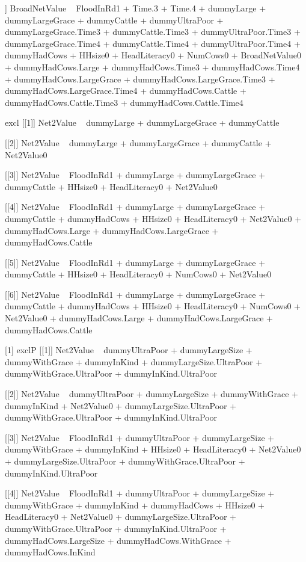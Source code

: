 \begin{Schunk}
\begin{Soutput}
[[6]]
BroadNetValue ~ FloodInRd1 + Time.3 + Time.4 + dummyLarge + dummyLargeGrace + 
    dummyCattle + dummyUltraPoor + dummyLargeGrace.Time3 + dummyCattle.Time3 + 
    dummyUltraPoor.Time3 + dummyLargeGrace.Time4 + dummyCattle.Time4 + 
    dummyUltraPoor.Time4 + dummyHadCows + HHsize0 + HeadLiteracy0 + 
    NumCows0 + BroadNetValue0 + dummyHadCows.Large + dummyHadCows.Time3 + 
    dummyHadCows.Time4 + dummyHadCows.LargeGrace + dummyHadCows.LargeGrace.Time3 + 
    dummyHadCows.LargeGrace.Time4 + dummyHadCows.Cattle + dummyHadCows.Cattle.Time3 + 
    dummyHadCows.Cattle.Time4
\end{Soutput}
\end{Schunk}
\begin{Schunk}
\begin{Soutput}
[1] excl
[[1]]
Net2Value ~ dummyLarge + dummyLargeGrace + dummyCattle

[[2]]
Net2Value ~ dummyLarge + dummyLargeGrace + dummyCattle + Net2Value0

[[3]]
Net2Value ~ FloodInRd1 + dummyLarge + dummyLargeGrace + dummyCattle + 
    HHsize0 + HeadLiteracy0 + Net2Value0

[[4]]
Net2Value ~ FloodInRd1 + dummyLarge + dummyLargeGrace + dummyCattle + 
    dummyHadCows + HHsize0 + HeadLiteracy0 + Net2Value0 + dummyHadCows.Large + 
    dummyHadCows.LargeGrace + dummyHadCows.Cattle

[[5]]
Net2Value ~ FloodInRd1 + dummyLarge + dummyLargeGrace + dummyCattle + 
    HHsize0 + HeadLiteracy0 + NumCows0 + Net2Value0

[[6]]
Net2Value ~ FloodInRd1 + dummyLarge + dummyLargeGrace + dummyCattle + 
    dummyHadCows + HHsize0 + HeadLiteracy0 + NumCows0 + Net2Value0 + 
    dummyHadCows.Large + dummyHadCows.LargeGrace + dummyHadCows.Cattle

[1] exclP
[[1]]
Net2Value ~ dummyUltraPoor + dummyLargeSize + dummyWithGrace + 
    dummyInKind + dummyLargeSize.UltraPoor + dummyWithGrace.UltraPoor + 
    dummyInKind.UltraPoor

[[2]]
Net2Value ~ dummyUltraPoor + dummyLargeSize + dummyWithGrace + 
    dummyInKind + Net2Value0 + dummyLargeSize.UltraPoor + dummyWithGrace.UltraPoor + 
    dummyInKind.UltraPoor

[[3]]
Net2Value ~ FloodInRd1 + dummyUltraPoor + dummyLargeSize + dummyWithGrace + 
    dummyInKind + HHsize0 + HeadLiteracy0 + Net2Value0 + dummyLargeSize.UltraPoor + 
    dummyWithGrace.UltraPoor + dummyInKind.UltraPoor

[[4]]
Net2Value ~ FloodInRd1 + dummyUltraPoor + dummyLargeSize + dummyWithGrace + 
    dummyInKind + dummyHadCows + HHsize0 + HeadLiteracy0 + Net2Value0 + 
    dummyLargeSize.UltraPoor + dummyWithGrace.UltraPoor + dummyInKind.UltraPoor + 
    dummyHadCows.LargeSize + dummyHadCows.WithGrace + dummyHadCows.InKind


\end{Soutput}
\end{Schunk}
